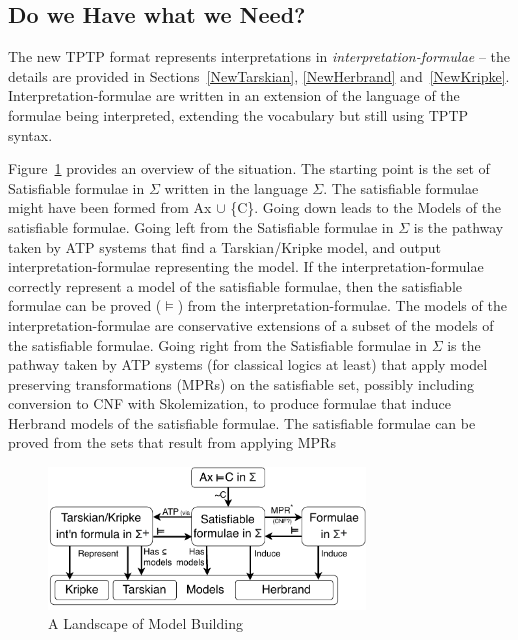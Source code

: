\documentclass{easychair}
\begin{document}
\subsection{Do we Have what we Need?}
\label{HaveNeed}

The new TPTP format represents interpretations in \emph{interpretation-formulae} -- the details 
are provided in Sections~\ref{NewTarskian}, \ref{NewHerbrand} and~\ref{NewKripke}.
Interpretation-formulae are written in an extension of the language of the formulae being 
interpreted, extending the vocabulary but still using TPTP syntax.

Figure~\ref{ModelLandscape} provides an overview of the situation.
The starting point is the set of {\sf Satisfiable formulae in $\Sigma$} written in the language
$\Sigma$. 
The satisfiable formulae might have been formed from 
{\sf Ax $\cup$ \{{\raisebox{0.4ex}{\texttildelow}}C\}}. 
Going down leads to the {\sf Models} of the satisfiable formulae.
Going left from the {\sf Satisfiable formulae in $\Sigma$} is the pathway taken by ATP systems 
that find a Tarskian/Kripke model, and output interpretation-formulae representing the model.
If the interpretation-formulae correctly represent a model of the satisfiable formulae, then
the satisfiable formulae can be proved ($\vDash$) from the interpretation-formulae.
The models of the interpretation-formulae are conservative extensions of a subset of the models 
of the satisfiable formulae.
Going right from the {\sf Satisfiable formulae in $\Sigma$} is the pathway taken by ATP systems
(for classical logics at least) that apply model preserving transformations ({\sf MPR}s) on the 
satisfiable set, possibly including conversion to CNF with Skolemization, to produce formulae 
that induce Herbrand models of the satisfiable formulae.
The satisfiable formulae can be proved from the sets that result from applying MPRs

\begin{figure}[htbp]
\centering
\includegraphics[width=0.75\textwidth]{ModelLandscape.pdf}
\caption{A Landscape of Model Building}
\label{ModelLandscape}
\end{figure}
\end{document}
